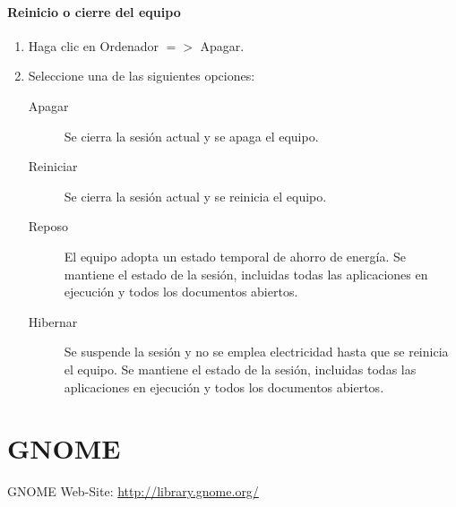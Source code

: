 \documentclass[12pt,letterpaper]{book}
\begin{document}
\subsection{Reinicio o cierre del equipo}
\begin{enumerate}
\item Haga clic en Ordenador $=>$ Apagar. 
\item Seleccione una de las siguientes opciones:
\begin{description}
\item[Apagar] Se cierra la sesión actual y se apaga el equipo.
\item[Reiniciar] Se cierra la sesión actual y se reinicia el equipo.
\item[Reposo] El equipo adopta un estado temporal de ahorro de energía. Se mantiene el estado de la sesión, incluidas todas las aplicaciones en ejecución y todos los documentos abiertos.
\item[Hibernar] Se suspende la sesión y no se emplea electricidad hasta que se reinicia el equipo. Se mantiene el estado de la sesión, incluidas todas las aplicaciones en ejecución y todos los documentos abiertos.
\end{description}
\end{enumerate}
\part{GNOME}
%
%
%

%

\begin{thebibliography}{5}
 GNOME Web-Site: \url{http://library.gnome.org/}
\end{thebibliography}
\end{document}

